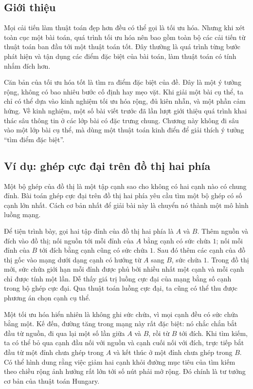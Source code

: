 \documentclass[11pt]{article}
\begin{document}
\subsection{Giới thiệu}

Mọi cải tiến làm thuật toán đẹp hơn đều có thể gọi là tối ưu hóa. Nhưng khi
xét toàn cục một bài toán, quá trình tối ưu hóa nên bao gồm toàn bộ các cải
tiến từ thuật toán ban đầu tới một thuật toán tốt. Đây thường là quá trình
từng bước phát hiện và tận dụng các điểm đặc biệt của bài toán, làm thuật toán
có tính nhắm đích hơn.

Căn bản của tối ưu hóa tốt là tìm ra điểm đặc biệt của đề. Đây là một ý tưởng
rộng, không có bao nhiêu bước cố định hay mẹo vặt. Khi giải một bài cụ thể,
ta chỉ có thể dựa vào kinh nghiệm tối ưu hóa rộng, đủ kiên nhẫn, và một phần
cảm hứng. Về kinh nghiệm, một số bài viết trước đã lần lượt giới thiệu quá
trình khai thác sâu thông tin ở các lớp bài có đặc trưng chung. Chương này
không đi sâu vào một lớp bài cụ thể, mà dùng một thuật toán kinh điển để giải
thích ý tưởng ``tìm điểm đặc biệt''.

\subsection{Ví dụ: ghép cực đại trên đồ thị hai phía}

Một bộ ghép của đồ thị là một tập cạnh sao cho không có hai cạnh nào có chung
đỉnh. Bài toán ghép cực đại trên đồ thị hai phía yêu cầu tìm một bộ ghép có
số cạnh lớn nhất. Cách cơ bản nhất để giải bài này là chuyển nó thành một mô
hình luồng mạng.

Để tiện trình bày, gọi hai tập đỉnh của đồ thị hai phía là \(A\) và \(B\).
Thêm nguồn và đích vào đồ thị; nối nguồn tới mỗi đỉnh của \(A\) bằng cạnh có
sức chứa \(1\); nối mỗi đỉnh của \(B\) tới đích bằng cạnh cũng có sức chứa
\(1\). Sau đó thêm các cạnh của đồ thị gốc vào mạng dưới dạng cạnh có hướng
từ \(A\) sang \(B\), sức chứa \(1\). Trong đồ thị mới, sức chứa giới hạn mỗi
đỉnh được phủ bởi nhiều nhất một cạnh và mỗi cạnh chỉ được tính một lần. Dễ
thấy giá trị luồng cực đại của mạng bằng số cạnh trong bộ ghép cực đại. Qua
thuật toán luồng cực đại, ta cũng có thể thu được phương án chọn cạnh cụ thể.

Một tối ưu hóa hiển nhiên là không ghi sức chứa, vì mọi cạnh đều có sức chứa
bằng một. Kế đến, đường tăng trong mạng này rất đặc biệt: nó chắc chắn bắt đầu
từ nguồn, đi qua lại một số lần giữa \(A\) và \(B\), rồi từ \(B\) tới đích.
Khi tìm kiếm, ta có thể bỏ qua cạnh đầu nối với nguồn và cạnh cuối nối với
đích, trực tiếp bắt đầu từ một đỉnh chưa ghép trong \(A\) và kết thúc ở một
đỉnh chưa ghép trong \(B\). Có thể hình dung rằng việc giảm hai cạnh khỏi
đường mục tiêu của tìm kiếm theo chiều rộng ảnh hưởng rất lớn tới số nút phải
mở rộng. Đó chính là tư tưởng cơ bản của thuật toán Hungary.
\end{document}

